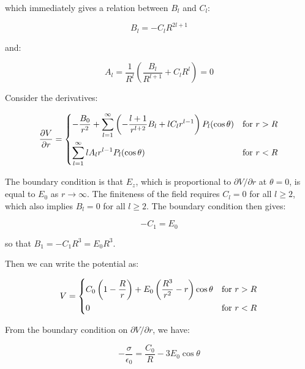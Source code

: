 \documentclass[12pt]{article}
\begin{document}
which immediately gives a relation between $B_{l}$ and $C_{l}$:

\begin{equation}
    B_{l} = -C_{l} R^{2l+1}
\end{equation}

and:

\begin{equation}
    A_{l} = \frac{1}{R^{l}} \left( \frac{B_{l}}{R^{l+1}} + C_{l} R^{l} \right) = 0
\end{equation}

Consider the derivatives:

\begin{equation}
\frac{\partial V}{\partial r} =
\begin{dcases}
    -\frac{B_{0}}{r^2} + \sum_{l=1}^{\infty} \left( -\frac{l+1}{r^{l+2}} B_{l} + l C_{l} r^{l-1} \right) P_{l}(\cos{\theta}) & \text{for } r > R \\
    \sum_{l=1}^{\infty} l A_{l} r^{l-1} P_{l}(\cos{\theta}) & \text{for } r < R
\end{dcases}
\end{equation}

The boundary condition is that $E_{z}$, which is proportional to $\partial V/\partial r$ at $\theta = 0$, is equal to $E_{0}$ as $r \to \infty$. The finiteness of the field requires $C_{l} = 0$ for all $l \ge 2$, which also implies $B_{l} = 0$ for all $l \ge 2$. The boundary condition then gives:

\begin{equation}
    -C_{1} = E_{0}
\end{equation}

so that $B_{1} = -C_{1} R^{3} = E_{0} R^{3}$.

Then we can write the potential as:

\begin{equation}
V =
\begin{dcases}
    C_{0} \left( 1 - \frac{R}{r} \right) + E_{0} \left( \frac{R^{3}}{r^{2}} - r \right) \cos{\theta} & \text{for } r > R \\
    0 & \text{for } r < R
\end{dcases}
\end{equation}

From the boundary condition on $\partial V/\partial r$, we have:

\begin{equation}
    -\frac{\sigma}{\epsilon_{0}} = \frac{C_{0}}{R} - 3E_{0} \cos{\theta}
\end{equation}
\end{document}
